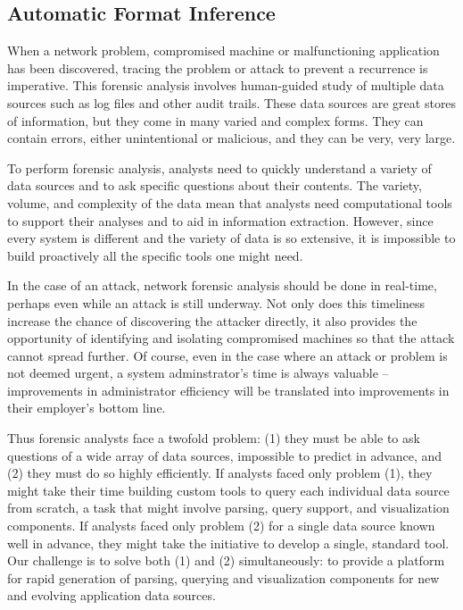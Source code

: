 \subsection{Automatic Format Inference}
\label{ssec:format-inference}

When a network problem, compromised machine or malfunctioning application
has been discovered, tracing the problem or attack to
prevent a recurrence is imperative.  This forensic analysis involves
human-guided study of multiple data sources such as log files and
other audit trails.  These data sources are great stores of
information, but they come in many varied and complex forms. They can
contain errors, either unintentional or malicious, and they can be
very, very large.  

To perform forensic analysis, analysts need to quickly understand a
variety of data sources and to ask specific questions about their
contents.  The variety, volume, and complexity of the data mean that
analysts need computational tools to support their analyses and to aid
in information extraction.  However, since every system is different
and the variety of data is so extensive, it is impossible to build
proactively all the specific tools one might need.

In the case of an attack, network forensic analysis should be done in
real-time, perhaps even while an attack is still underway. Not only
does this timeliness increase the chance of discovering the attacker
directly, it also provides the opportunity of identifying and
isolating compromised machines so that the attack cannot spread
further.  Of course, even in the case where an attack or problem is not
deemed urgent, a system adminstrator's time is always valuable --
improvements in administrator efficiency will be translated into 
improvements in their employer's bottom line.

Thus forensic analysts face a twofold problem: (1) they must be able
to ask questions of a wide array of data sources, impossible to
predict in advance, and (2) they must do so highly efficiently.  If
analysts faced only problem (1), they might take their time building
custom tools to query each individual data source from scratch, 
a task that might involve parsing, query support, and visualization 
components.  If analysts faced only problem (2) for a single data source 
known well in advance, they might take the initiative to develop a 
single, standard tool.  Our challenge is to solve both (1) and (2) 
simultaneously: to provide a platform for rapid generation of 
parsing, querying and visualization components for new and evolving
application data sources.

